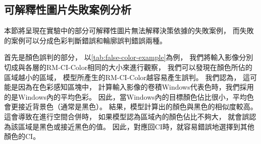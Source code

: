 \documentclass[class=NCU\_thesis, crop=false]{standalone}
\begin{document}
    \subsection{可解釋性圖片失敗案例分析}
    本節將呈現在實驗中的部分可解釋性圖片無法解釋決策依據的失敗案例，
    而失敗的案例可以分成色彩判斷錯誤和輪廓誤判錯誤兩種。

    首先是顏色誤判的部分，
    以\cref{tab:false-color-example}為例，
    我們將輸入影像分別切成與各層的RM-CI-Color相同的大小來進行觀察，
    我們可以發現在顏色所佔的區域越小的區域，
    模型所產生的RM-CI-Color越容易產生誤判。
    我們認為，
    這可能是因為在色彩感知區塊中，
    計算輸入影像的卷積Windows代表色時，我們採用的是Windows內的平均色彩。
    因此，當Windows內的目標顏色佔比很小，平均色會更接近背景色（通常是黑色）。
    結果，模型計算出的顏色與黑色的相似度較高。
    這會導致在進行空間合併時，
    如果模型認為區域內的顏色佔比不夠大，
    就會誤認為該區域是黑色或接近黑色的值。
    因此，對應回CI時，就容易錯誤地選擇到其他顏色的CI。
\end{document}
